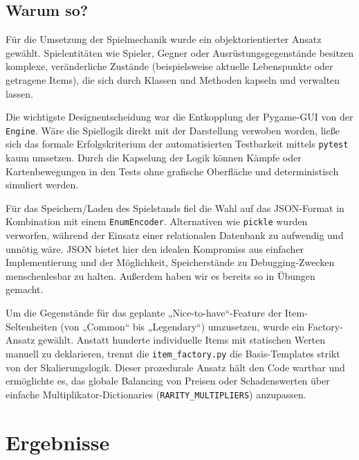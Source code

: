 \documentclass[12pt, a4paper]{article}
\begin{document}
\subsection{Warum so?}
Für die Umsetzung der Spielmechanik wurde ein objektorientierter Ansatz gewählt.
Spielentitäten wie Spieler, Gegner oder Ausrüstungsgegenstände besitzen komplexe, veränderliche Zustände (beispielsweise aktuelle Lebenspunkte oder getragene Items), die sich durch Klassen und Methoden kapseln und verwalten lassen.

Die wichtigste Designentscheidung war die Entkopplung der Pygame-GUI von der \texttt{Engine}.
Wäre die Spiellogik direkt mit der Darstellung verwoben worden, ließe sich das formale Erfolgskriterium der automatisierten Testbarkeit mittels \texttt{pytest} kaum umsetzen.
Durch die Kapselung der Logik können Kämpfe oder Kartenbewegungen in den Tests ohne grafische Oberfläche und deterministisch simuliert werden.

Für das Speichern/Laden des Spielstands fiel die Wahl auf das JSON-Format in Kombination mit einem \texttt{EnumEncoder}.
Alternativen wie \texttt{pickle} wurden verworfen, während der Einsatz einer relationalen Datenbank zu aufwendig und unnötig wäre.
JSON bietet hier den idealen Kompromiss aus einfacher Implementierung und der Möglichkeit, Speicherstände zu Debugging-Zwecken menschenlesbar zu halten.
Außerdem haben wir es bereits so in Übungen gemacht.

Um die Gegenstände für das geplante „Nice-to-have“-Feature der Item-Seltenheiten (von „Common“ bis „Legendary“) umzusetzen, wurde ein Factory-Ansatz gewählt.
Anstatt hunderte individuelle Items mit statischen Werten manuell zu deklarieren, trennt die \texttt{item\_factory.py} die Basis-Templates strikt von der Skalierungslogik.
Dieser prozedurale Ansatz hält den Code wartbar und ermöglichte es, das globale Balancing von Preisen oder Schadenswerten über einfache Multiplikator-Dictionaries (\texttt{RARITY\_MULTIPLIERS}) anzupassen.

\section{Ergebnisse}
\end{document}
